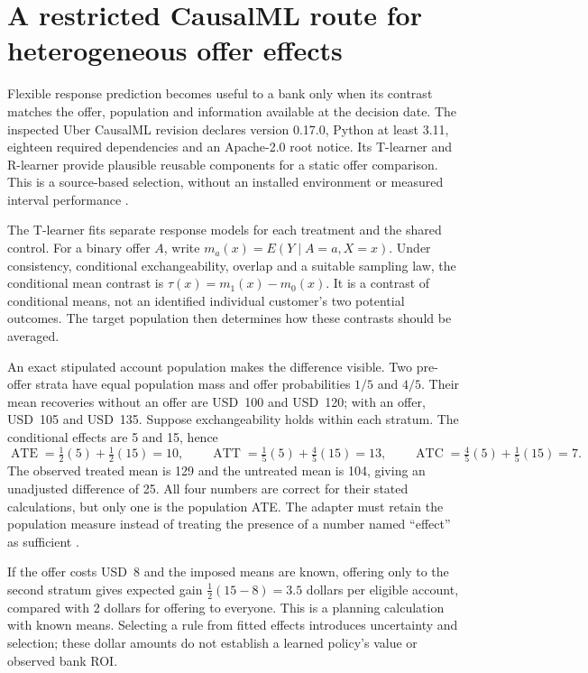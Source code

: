 \section{A restricted CausalML route for heterogeneous offer effects}
\label{exec14:causalml}

Flexible response prediction becomes useful to a bank only when its contrast
matches the offer, population and information available at the decision date.
The inspected Uber CausalML revision declares version 0.17.0, Python at least
3.11, eighteen required dependencies and an Apache-2.0 root notice. Its
T-learner and R-learner provide plausible reusable components for a static
offer comparison. This is a source-based selection, without an installed
environment or measured interval performance \citep{exec14_causalml_primary}.

The T-learner fits separate response models for each treatment and the shared
control. For a binary offer $A$, write
$m_a(x)=E(Y\mid A=a,X=x)$. Under consistency, conditional exchangeability,
overlap and a suitable sampling law, the conditional mean contrast is
$\tau(x)=m_1(x)-m_0(x)$. It is a contrast of conditional means, not an identified
individual customer's two potential outcomes. The target population then
determines how these contrasts should be averaged.

An exact stipulated account population makes the difference visible. Two
pre-offer strata have equal population mass and offer probabilities $1/5$
and $4/5$. Their mean recoveries without an offer are USD~100 and USD~120;
with an offer, USD~105 and USD~135. Suppose exchangeability holds within each
stratum. The conditional effects are 5 and 15, hence
\[
\operatorname{ATE}=\tfrac12(5)+\tfrac12(15)=10,\qquad
\operatorname{ATT}=\tfrac15(5)+\tfrac45(15)=13,\qquad
\operatorname{ATC}=\tfrac45(5)+\tfrac15(15)=7.
\]
The observed treated mean is 129 and the untreated mean is 104, giving an
unadjusted difference of 25. All four numbers are correct for their stated
calculations, but only one is the population ATE. The adapter must retain
the population measure instead of treating the presence of a number named
``effect'' as sufficient \citep{exec14_causalml_oracle}.

If the offer costs USD~8 and the imposed means are known, offering only to the
second stratum gives expected gain $\tfrac12(15-8)=3.5$ dollars per eligible
account, compared with 2 dollars for offering to everyone. This is a planning
calculation with known means. Selecting a rule from fitted effects introduces
uncertainty and selection; these dollar amounts do not establish a learned
policy's value or observed bank ROI.

